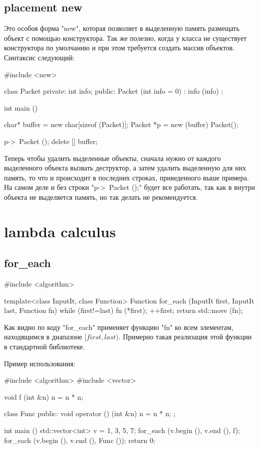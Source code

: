 \subsection{placement new}
Это особоя форма \cpp"new", которая позволяет в выделенную память размещать объект с помощью конструктора.
Так же полезно, когда у класса не существует конструктора по умолчанию и при этом требуется создать массив объектов.
Синтаксис следующий:

\begin{cppcode}
#include <new>

class Packet {
private: 
    int info;
public:
    Packet (int info = 0) : info (info) {}
};

int main () {
    char* buffer = new char[sizeof (Packet)];
    Packet *p = new (buffer) Packet();

    p->~Packet ();
    delete [] buffer;
}
\end{cppcode}

Теперь чтобы удалить выделенные объекты, сначала нужно от каждого выделенного объекта вызвать деструктор, а затем удалить выделенную для них память, то что и происходит в последних строках, приведенного выше примера.
На самом деле и без строки \cpp"p->~Packet ();" будет все работать, так как в внутри объекта не выделяется память, но так делать не рекомендуется.

\section{lambda calculus}

\subsection{for\_each}
\begin{cppcode}
#include <algorithm>

template<class InputIt, class Function>
Function for_each (InputIt first, InputIt last, Function fn) {
    while (first!=last) {
        fn (*first);
        ++first;
    }
    return std::move (fn);
}
\end{cppcode}

Как видно по коду \cpp"for_each" применяет функцию \cpp"fn" ко всем элементам, находящимся в диапазоне $[first, last)$.
Примерно такая реализация этой функции в стандартной библиотеке.

Пример использования:

\begin{cppcode}
#include <algorithm>
#include <vector>

void f (int &n) {
    n = n * n;
}

class Func {
public:
    void operator () (int &n) {
        n = n * n;
    }
};

int main () {
    std::vector<int> v = {1, 3, 5, 7};
    for_each (v.begin (), v.end (), f);
    for_each (v.begin (), v.end (), Func ());
    return 0;
}
\end{cppcode}

